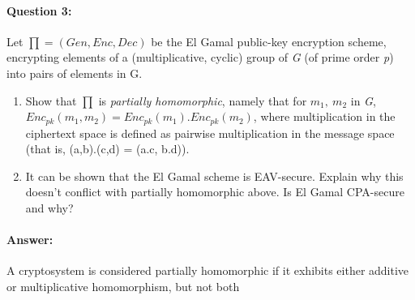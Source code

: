 \documentclass{article}
\begin{document}
    \paragraph{Question 3:} Let $\prod = (Gen, Enc, Dec)$ be the El Gamal public-key encryption scheme, encrypting elements of a (multiplicative, cyclic) group of \emph{G} (of prime order \emph{p}) into pairs of elements in G.
    \begin{enumerate}
        \item Show that $\prod$ is \emph{partially homomorphic}, namely that for $m_1,\ m_2$ in \emph{G}, $Enc_{pk}(m_1,m_2) = Enc_{pk}(m_1).Enc_{pk}(m_2)$, where multiplication in the ciphertext space is defined as pairwise multiplication in the message space (that is, (a,b).(c,d) = (a.c, b.d)).
        \item It can be shown that the El Gamal scheme is EAV-secure. Explain why this doesn't conflict with partially homomorphic above. Is El Gamal CPA-secure and why?
    \end{enumerate}
    
    \paragraph{Answer:\newline}
        A cryptosystem is considered partially homomorphic if it exhibits either additive or multiplicative homomorphism, but not both\citep{homomorphicdef}
        
\end{document}
